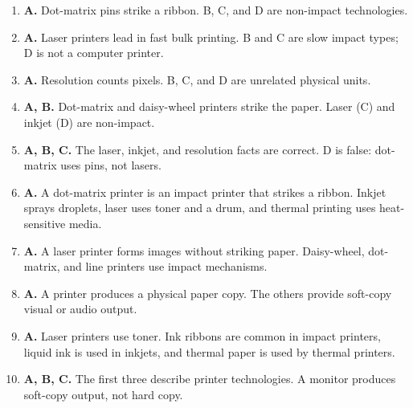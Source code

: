 \begin{enumerate}[label=\textbf{Q\arabic*.}, leftmargin=*]
\item \textbf{A.} Dot-matrix pins strike a ribbon. B, C, and D are non-impact technologies.
\item \textbf{A.} Laser printers lead in fast bulk printing. B and C are slow impact types; D is not a computer printer.
\item \textbf{A.} Resolution counts pixels. B, C, and D are unrelated physical units.
\item \textbf{A, B.} Dot-matrix and daisy-wheel printers strike the paper. Laser (C) and inkjet (D) are non-impact.
\item \textbf{A, B, C.} The laser, inkjet, and resolution facts are correct. D is false: dot-matrix uses pins, not lasers.
\item \textbf{A.} A dot-matrix printer is an impact printer that strikes a ribbon. Inkjet sprays droplets, laser uses toner and a drum, and thermal printing uses heat-sensitive media.

\item \textbf{A.} A laser printer forms images without striking paper. Daisy-wheel, dot-matrix, and line printers use impact mechanisms.

\item \textbf{A.} A printer produces a physical paper copy. The others provide soft-copy visual or audio output.

\item \textbf{A.} Laser printers use toner. Ink ribbons are common in impact printers, liquid ink is used in inkjets, and thermal paper is used by thermal printers.

\item \textbf{A, B, C.} The first three describe printer technologies. A monitor produces soft-copy output, not hard copy.

\end{enumerate}
